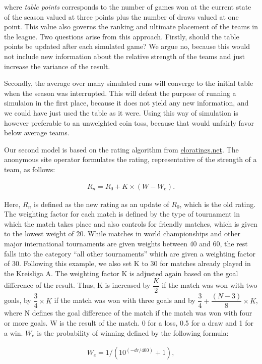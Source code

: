\documentclass[12pt,a4paper]{article}
\begin{document}
where \emph{table points} corresponds to the number of games won at the
current state of the season valued at three points plus the number of
draws valued at one point. This value also governs the ranking and
ultimate placement of the teams in the league. Two questions arise from
this approach. Firstly, should the table points be updated after each
simulated game? We argue no, because this would not include new
information about the relative strength of the teams and just increase
the variance of the result.

Secondly, the average over many simulated runs will converge to the
initial table when the season was interrupted. This will defeat the
purpose of running a simulaion in the first place, because it does not
yield any new information, and we could have just used the table as it
were. Using this way of simulation is however preferable to an
unweighted coin toss, because that would unfairly favor below average
teams.

Our second model is based on the rating algorithm from
\href{eloratings.net/about}{eloratings.net}. The anonymous site operator
formulates the rating, representative of the strength of a team, as
follows:

\begin{align}
R_n = R_0 + K \times (W - W_e).
\end{align}

Here, \(R_n\) is defined as the new rating as an update of \(R_0\),
which is the old rating. The weighting factor for each match is defined
by the type of tournament in which the match takes place and also
controls for friendly matches, which is given to the lowest weight of
20. While matches in world championships and other major international
tournaments are given weights between 40 and 60, the rest falls into the
category \enquote{all other tournaments} which are given a weighting
factor of 30. Following this example, we also set K to 30 for matches
already played in the Kreisliga A. The weighting factor K is adjusted
again based on the goal difference of the result. Thus, K is increased
by \(\dfrac{K}{2}\) if the match was won with two goals, by
\(\dfrac{3}{4}\times K\) if the match was won with three goals and by
\(\dfrac{3}{4} + \dfrac{(N-3)}{8} \times K\), where N defines the goal
difference of the match if the match was won with four or more goals. W
is the result of the match. 0 for a loss, 0.5 for a draw and 1 for a
win. \(W_e\) is the probability of winning defined by the following
formula:

\begin{align}
W_e = 1/(10^{(-dr/400)}+1),
\end{align}
\end{document}
